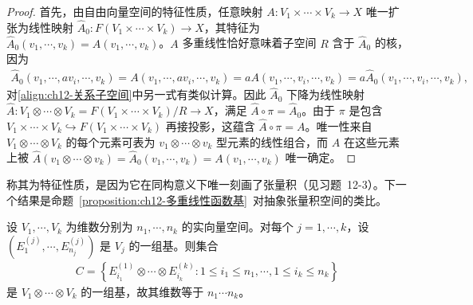 \documentclass[../../main.tex]{subfiles}
\begin{document}
\begin{proof}
首先，由自由向量空间的特征性质，任意映射 $A\colon V_1\times\cdots\times V_k\to X$ 唯一扩张为线性映射 $\widehat A_0\colon F(V_1\times\cdots\times V_k)\to X$，其特征为 $\widehat A_0(v_1,\cdots ,v_k)=A(v_1,\cdots ,v_k)$。$A$ 多重线性恰好意味着子空间 $R$ 含于 $\widehat A_0$ 的核，因为
\begin{align*}
\widehat A_0(v_1,\cdots ,a v_i,\cdots ,v_k)=A(v_1,\cdots ,a v_i,\cdots ,v_k)=aA(v_1,\cdots ,v_i,\cdots ,v_k)=a\widehat A_0(v_1,\cdots ,v_i,\cdots ,v_k),
\end{align*}
对\eqref{align:ch12-关系子空间}中另一式有类似计算。因此 $\widehat A_0$ 下降为线性映射 $\widehat A\colon V_1\otimes\cdots\otimes V_k=F(V_1\times\cdots\times V_k)/R\to X$，满足 $\widehat A\circ\pi=\widehat A_0$。由于 $\pi$ 是包含 $V_1\times\cdots\times V_k\hookrightarrow F(V_1\times\cdots\times V_k)$ 再接投影，这蕴含 $\widehat A\circ\pi=A$。唯一性来自 $V_1\otimes\cdots\otimes V_k$ 的每个元素可表为 $v_1\otimes\cdots\otimes v_k$ 型元素的线性组合，而 $\widehat A$ 在这些元素上被 $\widehat A(v_1\otimes\cdots\otimes v_k)=\widehat A_0(v_1,\cdots ,v_k)=A(v_1,\cdots ,v_k)$ 唯一确定。
\end{proof}

称其为特征性质，是因为它在同构意义下唯一刻画了张量积（见习题~12-3）。下一个结果是命题~\ref{proposition:ch12-多重线性函数基}~对抽象张量积空间的类比。

\begin{proposition}[张量积空间的一组基]\label{proposition:ch12-张量积基}
设 $V_1,\cdots ,V_k$ 为维数分别为 $n_1,\cdots ,n_k$ 的实向量空间。对每个 $j=1,\cdots ,k$，设 $(E^{(j)}_1,\cdots ,E^{(j)}_{n_j})$ 是 $V_j$ 的一组基。则集合
\begin{align*}
C=\left\{E^{(1)}_{i_1}\otimes\cdots\otimes E^{(k)}_{i_k}:1\leqslant i_1\leqslant n_1,\cdots ,1\leqslant i_k\leqslant n_k\right\}
\end{align*}
是 $V_1\otimes\cdots\otimes V_k$ 的一组基，故其维数等于 $n_1\cdots n_k$。
\end{proposition}
\end{document}
